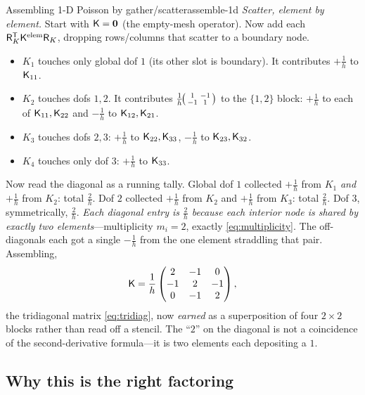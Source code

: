 \begin{workedexample}{Assembling 1-D Poisson by gather/scatter}{assemble-1d}
\emph{Scatter, element by element.} Start with $\mathsf{K}=\mathbf 0$ (the
empty-mesh operator). Now add each $\mathsf{R}_K^{\mathsf T}\mathsf{K}^{\mathrm{elem}}
\mathsf{R}_K$, dropping rows/columns that scatter to a boundary node.
\begin{itemize}[nosep]
\item $K_1$ touches only global dof $1$ (its other slot is boundary). It
contributes $+\tfrac1h$ to $\mathsf{K}_{11}$.
\item $K_2$ touches dofs $1,2$. It contributes $\tfrac1h\!\begin{psmallmatrix}1&-1\\-1&1\end{psmallmatrix}$
to the $\{1,2\}$ block: $+\tfrac1h$ to each of $\mathsf{K}_{11},\mathsf{K}_{22}$ and
$-\tfrac1h$ to $\mathsf{K}_{12},\mathsf{K}_{21}$.
\item $K_3$ touches dofs $2,3$: $+\tfrac1h$ to $\mathsf{K}_{22},\mathsf{K}_{33}$,
$-\tfrac1h$ to $\mathsf{K}_{23},\mathsf{K}_{32}$.
\item $K_4$ touches only dof $3$: $+\tfrac1h$ to $\mathsf{K}_{33}$.
\end{itemize}
Now read the diagonal as a running tally. Global dof $1$ collected $+\tfrac1h$
from $K_1$ \emph{and} $+\tfrac1h$ from $K_2$: total $\tfrac2h$. Dof $2$ collected
$+\tfrac1h$ from $K_2$ and $+\tfrac1h$ from $K_3$: total $\tfrac2h$. Dof $3$,
symmetrically, $\tfrac2h$. \emph{Each diagonal entry is $\tfrac2h$ because each
interior node is shared by exactly two elements}---multiplicity $m_i=2$, exactly
\cref{eq:multiplicity}. The off-diagonals each got a single $-\tfrac1h$ from the
one element straddling that pair. Assembling,
\[
\mathsf{K}=\frac1h
\begin{pmatrix} 2 & -1 & 0\\ -1 & 2 & -1\\ 0 & -1 & 2\end{pmatrix},
\]
the tridiagonal matrix \cref{eq:tridiag}, now \emph{earned} as a superposition of
four $2\times2$ blocks rather than read off a stencil. The ``$2$'' on the
diagonal is not a coincidence of the second-derivative formula---it is two
elements each depositing a $1$.
\end{workedexample}

\subsection{Why this is the right factoring}


